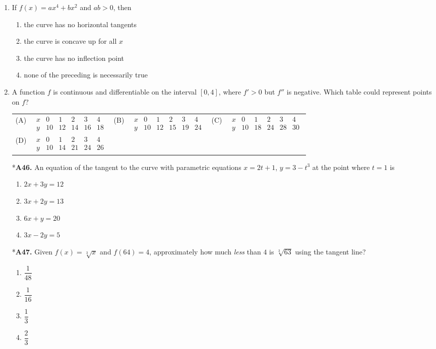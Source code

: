 \documentclass[12pt]{article}
\begin{document}
\begin{enumerate}[label=\textbf{A\arabic*.},resume]
\item If $f(x)=ax^{4}+bx^{2}$ and $ab>0$, then
\begin{enumerate}[label=(\Alph*)]
\item the curve has no horizontal tangents
\item the curve is concave up for all $x$
\item the curve has no inflection point
\item none of the preceding is necessarily true
\end{enumerate}

\item A function $f$ is continuous and differentiable on the interval $[0,4]$, where $f'>0$ but $f''$ is negative. Which table could represent points on $f$?
\medskip

\begin{tabular}{@{}l@{\quad}c@{\;}c@{\;}c@{\;}c@{\;}c@{}}
(A) &
$\begin{array}{c|ccccc}
x&0&1&2&3&4\\\hline
y&10&12&14&16&18
\end{array}$
&
\quad (B) &
$\begin{array}{c|ccccc}
x&0&1&2&3&4\\\hline
y&10&12&15&19&24
\end{array}$
&
\quad (C) &
$\begin{array}{c|ccccc}
x&0&1&2&3&4\\\hline
y&10&18&24&28&30
\end{array}$
\\[1.2em]
(D) &
$\begin{array}{c|ccccc}
x&0&1&2&3&4\\\hline
y&10&14&21&24&26
\end{array}$ &&&&
\end{tabular}

\item[*\textbf{A46.}] An equation of the tangent to the curve with parametric equations $x=2t+1$, $y=3-t^{3}$ at the point where $t=1$ is
\begin{enumerate}[label=(\Alph*)]
\item $2x+3y=12$ \item $3x+2y=13$ \item $6x+y=20$ \item $3x-2y=5$
\end{enumerate}

\item[*\textbf{A47.}] Given $f(x)=\sqrt[3]{x}$ and $f(64)=4$, approximately how much \emph{less} than $4$ is $\sqrt[3]{63}$ using the tangent line?
\begin{enumerate}[label=(\Alph*)]
\item $\dfrac{1}{48}$ \item $\dfrac{1}{16}$ \item $\dfrac{1}{3}$ \item $\dfrac{2}{3}$
\end{enumerate}


\end{enumerate}
\end{document}
